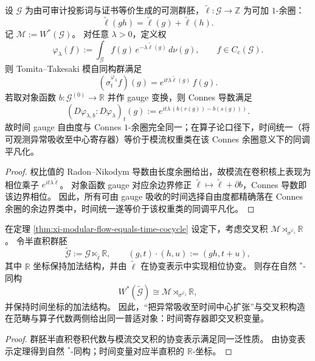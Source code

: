 \begin{theorem}\label{thm:xi-modular-flow-equals-time-cocycle}
设 \(\mathcal G\) 为由可审计投影词与证书等价生成的可测群胚，\(\widetilde\ell:\mathcal G\to\mathbb Z\) 为可加 \(1\)-余圈：
\[
\widetilde\ell(gh)=\widetilde\ell(g)+\widetilde\ell(h).
\]
记 \(\mathcal M:=W^\ast(\mathcal G)\)。
对任意 \(\lambda>0\)，定义权
\[
\varphi_\lambda(f):=\int_{\mathcal G} f(g)\,e^{-\lambda\widetilde\ell(g)}\,d\nu(g),\qquad f\in C_c(\mathcal G).
\]
则 Tomita--Takesaki 模自同构群满足
\[
(\sigma_t^{\varphi_\lambda}f)(g)=e^{it\lambda\widetilde\ell(g)}\,f(g).
\]
若取对象函数 \(b:\mathcal G^{(0)}\to\mathbb R\) 并作 gauge 变换，则 Connes 导数满足
\[
(D\varphi_{\lambda,b}:D\varphi_\lambda)_t(g)
:=e^{it\lambda\,(b(r(g))-b(s(g)))}.
\]
故时间 gauge 自由度与 Connes \(1\)-余圈完全同一；在算子论口径下，时间统一（将可观测异常吸收至中心寄存器）等价于模流权重类在该 Connes 余圈意义下的同调平凡化。
\end{theorem}

\begin{proof}
权比值的 Radon--Nikodym 导数由长度余圈给出，故模流在卷积核上表现为相位乘子 \(e^{it\lambda\widetilde\ell}\)。
对象函数 gauge 对应余边界修正 \(\widetilde\ell\mapsto \widetilde\ell+\partial b\)，Connes 导数即该边界相位。
因此，所有可由 gauge 吸收的时间选择自由度都精确落在 Connes 余圈的余边界类中，时间统一遂等价于该权重类的同调平凡化。
\end{proof}

\begin{theorem}\label{thm:xi-time-register-crossed-product-equivalence}
在定理 \ref{thm:xi-modular-flow-equals-time-cocycle} 设定下，考虑交叉积
\(
\mathcal M\rtimes_{\sigma^{\varphi_\lambda}}\mathbb R
\)。
令半直积群胚
\[
\widetilde{\mathcal G}:=\mathcal G\ltimes_{\widetilde\ell}\mathbb R,
\qquad
(g,t)\cdot(h,u):=(gh,t+u),
\]
其中 \(\mathbb R\) 坐标保持加法结构，并由 \(\widetilde\ell\) 在协变表示中实现相位协变。
则存在自然 \(^\ast\)-同构
\[
W^\ast(\widetilde{\mathcal G})
\cong
\mathcal M\rtimes_{\sigma^{\varphi_\lambda}}\mathbb R,
\]
并保持时间坐标的加法结构。
因此，“把异常吸收至时间中心扩张”与交叉积构造在范畴与算子代数两侧给出同一普适对象：时间寄存器即交叉积变量。
\end{theorem}

\begin{proof}
群胚半直积卷积代数与模流交叉积的协变表示满足同一泛性质。
由协变表示定理得到自然 \(^\ast\)-同构；时间变量对应半直积的 \(\mathbb R\)-坐标。
\end{proof}

